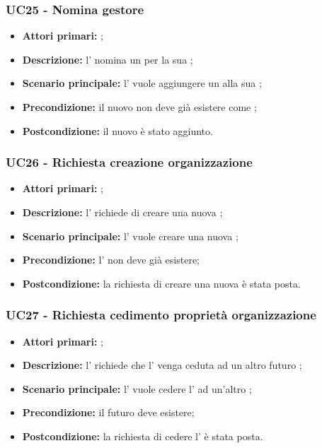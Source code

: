 \documentclass[casi-duso]{subfiles}
\begin{document}
\subsubsection{UC25 - Nomina gestore}
\label{subsub:UC25}
\begin{itemize}
  \item \textbf{Attori primari:} ;
  \item \textbf{Descrizione:} l'  nomina un  per la sua ;
  \item \textbf{Scenario principale:} l'  vuole aggiungere un  alla sua ;
  \item \textbf{Precondizione:} il nuovo  non deve già esistere come ;
  \item \textbf{Postcondizione:} il nuovo  è stato aggiunto.
\end{itemize}

\subsubsection{UC26 - Richiesta creazione organizzazione}
\label{subsub:UC26}
\begin{itemize}
  \item \textbf{Attori primari:} ;
  \item \textbf{Descrizione:} l'  richiede di creare una nuova ;
  \item \textbf{Scenario principale:} l'  vuole creare una nuova ;
  \item \textbf{Precondizione:} l'  non deve già esistere;
  \item \textbf{Postcondizione:} la richiesta di creare una nuova  è stata posta.
\end{itemize}

\subsubsection{UC27 - Richiesta cedimento proprietà organizzazione}
\label{subsub:UC27}
\begin{itemize}
  \item \textbf{Attori primari:} ;
  \item \textbf{\textbf{Descrizione:}} l'  richiede che l' venga ceduta ad un altro futuro ;
  \item \textbf{\textbf{Scenario principale:}} l'  vuole cedere l' ad un'altro ;
  \item \textbf{Precondizione:} il futuro  deve esistere;
  \item \textbf{Postcondizione:} la richiesta di cedere l' è stata posta.
\end{itemize}

\end{document}
